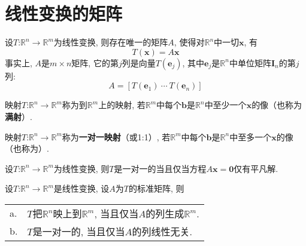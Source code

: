\section{线性变换的矩阵}
\begin{TheoremOne}
设$T$:$\mathbb{R}^n\rightarrow\mathbb{R}^m$为线性变换, 则存在唯一的矩阵$A$, 使得对$\mathbb{R}^n$中一切$\bm{x}$, 有
\[T(\bm{x})=A\bm{x}\]
事实上, $A$是$m\times n$矩阵, 它的第$j$列是向量$T(\bm{e}_j)$, 其中$\bm{e}_j$是$\mathbb{R}^n$中单位矩阵$\bm{I}_n$的第$j$列:
\[A=[T(\bm{e}_1)\ \cdots\ T(\bm{e}_n)]\]
\end{TheoremOne}\vspace{4ex}

\begin{definition}
映射$T$:$\mathbb{R}^n\rightarrow\mathbb{R}^m$称为到$\mathbb{R}^m$上的映射, 若$\mathbb{R}^m$中每个$\bm{b}$是$\mathbb{R}^n$中至少一个$\bm{x}$的像（也称为\textbf{满射}）.
\end{definition}\vspace{4ex}

\begin{definition}
映射$T$:$\mathbb{R}^n\rightarrow\mathbb{R}^m$称为\textbf{一对一映射}（或1:1）, 若$\mathbb{R}^m$中每个$\bm{b}$是$\mathbb{R}^n$中至多一个$\bm{x}$的像（也称为）.
\end{definition}\vspace{4ex}

\begin{TheoremOne}
设$T$:$\mathbb{R}^n\rightarrow\mathbb{R}^m$为线性变换, 则$T$是一对一的当且仅当方程$A\bm{x}=\bm{0}$仅有平凡解.
\end{TheoremOne}\vspace{4ex}

\begin{TheoremOne}
设$T$:$\mathbb{R}^n\rightarrow\mathbb{R}^m$是线性变换, 设$A$为$T$的标准矩阵, 则\\
\begin{tabular}{l@{\ }l}
a. & $T$把$\mathbb{R}^n$映上到$\mathbb{R}^m$, 当且仅当$A$的列生成$\mathbb{R}^m$.\\
b. & $T$是一对一的, 当且仅当$A$的列线性无关.
\end{tabular}
\end{TheoremOne}\vspace{2ex}


